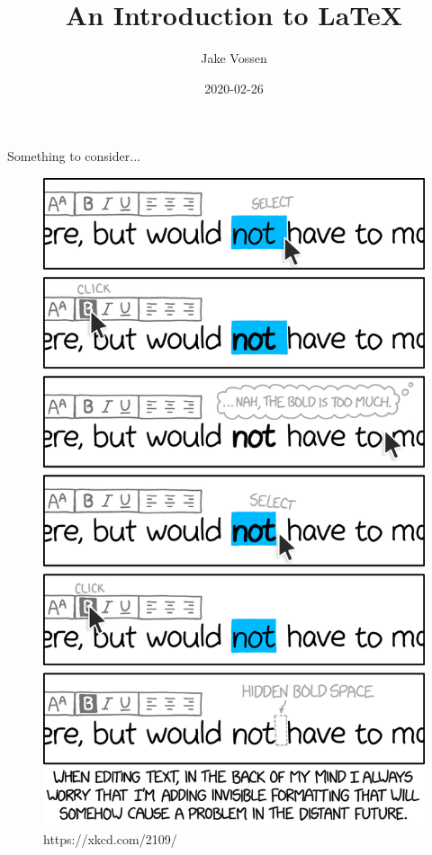 \documentclass{beamer}
\title{An Introduction to \LaTeX}
\author{Jake Vossen}
\institute{Colorado School of Mines - acm-w}
\date{2020-02-26}
\begin{document}
\begin{frame}{Something to consider...}
    \begin{figure}
    \includegraphics[scale=.13]{invisible_formatting_2x.png}
    \caption{https://xkcd.com/2109/}
  \end{figure}
\end{frame}
\begin{frame}
  \titlepage
\end{frame}

\end{document}
